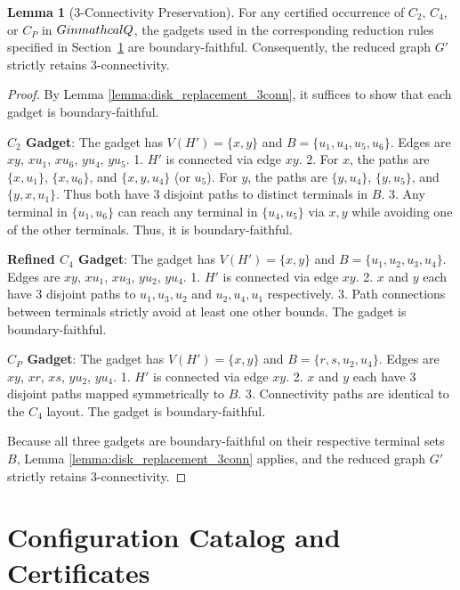 \documentclass[12pt]{article}
\theoremstyle{definition}
\newtheorem{lemma}[theorem]{Lemma}
\begin{document}
\begin{lemma}[3-Connectivity Preservation]
\label{lemma:3conn_preservation}
For any certified occurrence of $C_2$, $C_4$, or $C_P$ in $G \\in \\mathcal{Q}$, the gadgets used in the corresponding reduction rules specified in Section~\ref{sec:catalog} are boundary-faithful. Consequently, the reduced graph $G'$ strictly retains 3-connectivity.
\end{lemma}
\begin{proof}
By Lemma \ref{lemma:disk_replacement_3conn}, it suffices to show that each gadget is boundary-faithful.

\textbf{$C_2$ Gadget}:
The gadget has $V(H') = \{x, y\}$ and $B = \{u_1, u_4, u_5, u_6\}$. Edges are $xy$, $xu_1$, $xu_6$, $yu_4$, $yu_5$.
1. $H'$ is connected via edge $xy$.
2. For $x$, the paths are $\{x, u_1\}$, $\{x, u_6\}$, and $\{x, y, u_4\}$ (or $u_5$). For $y$, the paths are $\{y, u_4\}$, $\{y, u_5\}$, and $\{y, x, u_1\}$. Thus both have 3 disjoint paths to distinct terminals in $B$.
3. Any terminal in $\{u_1, u_6\}$ can reach any terminal in $\{u_4, u_5\}$ via $x, y$ while avoiding one of the other terminals. Thus, it is boundary-faithful.

\textbf{Refined $C_4$ Gadget}:
The gadget has $V(H') = \{x, y\}$ and $B = \{u_1, u_2, u_3, u_4\}$. Edges are $xy$, $xu_1$, $xu_3$, $yu_2$, $yu_4$.
1. $H'$ is connected via edge $xy$.
2. $x$ and $y$ each have 3 disjoint paths to $u_1, u_3, u_2$ and $u_2, u_4, u_1$ respectively.
3. Path connections between terminals strictly avoid at least one other bounds. The gadget is boundary-faithful.

\textbf{$C_P$ Gadget}:
The gadget has $V(H') = \{x, y\}$ and $B = \{r, s, u_2, u_4\}$. Edges are $xy$, $xr$, $xs$, $yu_2$, $yu_4$.
1. $H'$ is connected via edge $xy$.
2. $x$ and $y$ each have 3 disjoint paths mapped symmetrically to $B$.
3. Connectivity paths are identical to the $C_4$ layout. The gadget is boundary-faithful.

Because all three gadgets are boundary-faithful on their respective terminal sets $B$, Lemma \ref{lemma:disk_replacement_3conn} applies, and the reduced graph $G'$ strictly retains 3-connectivity.
\end{proof}


\section{Configuration Catalog and Certificates}
\label{sec:catalog}
\end{document}
